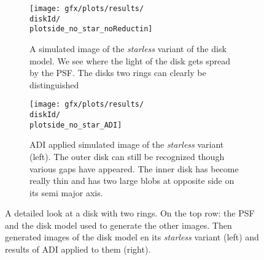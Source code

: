 \begin{figure}[h!]
{\begin{minipage}[t]{1.2\textwidth}
      \begin{subfigure}[t]{0.6\textwidth}
        \centering
        \texttt{[image: gfx/plots/results/\\diskId/\\plotside\_no\_star\_noReductin]}
        \caption{A simulated image of the \textit{starless} variant of the disk model. We see where the light of the disk gets spread by the PSF. The disks two rings can clearly be distinguished}
        \label{fig:disk0_nostar_simulated}
      \end{subfigure}%
      \begin{subfigure}[t]{0.6\textwidth}
        \centering
        \texttt{[image: gfx/plots/results/\\diskId/\\plotside\_no\_star\_ADI]}
        \caption{\ac{ADI} applied simulated image of the \textit{starless} variant (left). The outer disk can still be recognized though various gaps have appeared. The inner disk has become really thin and has two large blobs at opposite side on its semi major axis.}
        \label{fig:disk0_nostar_adi}
      \end{subfigure}
  \end{minipage}
  }%

  \caption{A detailed look at a disk with two rings. On the top row: the \ac{PSF} and the disk model used to generate the other images. Then generated images of the disk model en its \textit{starless} variant (left) and results of \ac{ADI} applied to them (right).}
  \label{fig:disk0_0}
\end{figure}

